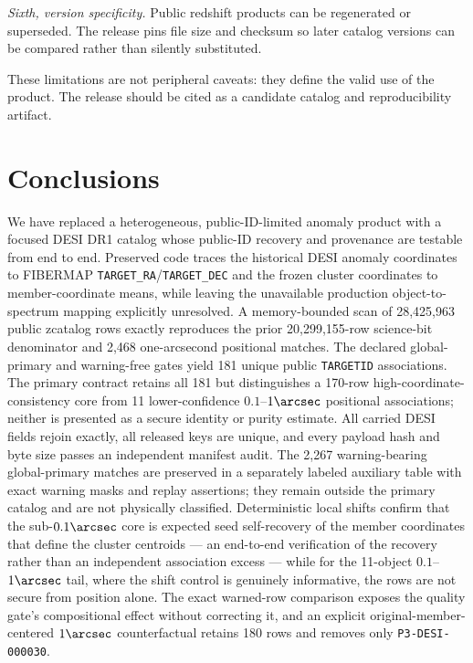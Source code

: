 \documentclass[twocolumn,linenumbers]{aastex702}
\begin{document}
\textit{Sixth, version specificity.}  Public redshift products can be regenerated or superseded.
The release pins file size and checksum so later catalog versions can be compared rather than
silently substituted.

These limitations are not peripheral caveats: they define the valid use of the product.  The
release should be cited as a candidate catalog and reproducibility artifact.

\section{Conclusions}\label{sec:conclusions}

We have replaced a heterogeneous, public-ID-limited anomaly product with a focused DESI DR1
catalog whose public-ID recovery and provenance are testable from end to end.  Preserved code traces
the historical DESI anomaly coordinates to FIBERMAP \texttt{TARGET\_RA}/\texttt{TARGET\_DEC} and
the frozen cluster coordinates to member-coordinate means, while leaving the unavailable production
object-to-spectrum mapping explicitly unresolved.  A memory-bounded scan of
28,425,963 public zcatalog rows exactly reproduces the prior 20,299,155-row science-bit denominator
and 2,468 one-arcsecond positional matches.  The declared global-primary and warning-free gates
yield 181 unique public \texttt{TARGETID} associations.  The primary contract retains all 181 but
distinguishes a 170-row high-coordinate-consistency core from 11 lower-confidence $0.1$--$1\arcsec$
positional associations; neither is presented as a secure identity or purity estimate.  All carried
DESI fields rejoin exactly, all released
keys are unique, and every payload hash and byte size passes an independent manifest audit.
The 2,267 warning-bearing global-primary matches are preserved in a separately labeled auxiliary
table with exact warning masks and replay assertions; they remain outside the primary catalog and
are not physically classified.
Deterministic local shifts confirm that the sub-$0.1\arcsec$ core is expected seed self-recovery of
the member coordinates that define the cluster centroids --- an end-to-end verification of the
recovery rather than an independent association excess --- while for the 11-object
$0.1$--$1\arcsec$ tail, where the shift control is genuinely informative, the rows are not secure
from position alone.  The exact warned-row
comparison exposes the quality gate's compositional effect without correcting it, and an explicit
original-member-centered $1\arcsec$ counterfactual retains 180 rows and removes only
\texttt{P3-DESI-000030}.
\end{document}
